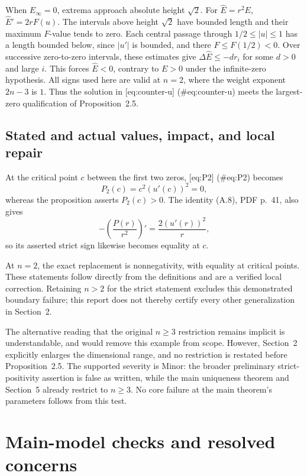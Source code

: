 \documentclass[10pt]{article}
\begin{document}
When \(E_\infty=0\), extrema approach absolute height \(\sqrt2\). For \(\widehat E=r^2E\), \(\widehat E'=2rF(u)\). The intervals above height \(\sqrt2\) have bounded length and their maximum \(F\)-value tends to zero. Each central passage through \(1/2\le|u|\le1\) has a length bounded below, since \(|u'|\) is bounded, and there \(F\le F(1/2)<0\). Over successive zero-to-zero intervals, these estimates give \(\Delta\widehat E\le-d r_i\) for some \(d>0\) and large \(i\). This forces \(\widehat E<0\), contrary to \(E>0\) under the infinite-zero hypothesis. All signs used here are valid at \(n=2\), where the weight exponent \(2n-3\) is \(1\). Thus the solution in [eq:counter-u] (\#eq:counter-u) meets the largest-zero qualification of Proposition 2.5.\par
\subsection*{Stated and actual values, impact, and local repair}
At the critical point \(c\) between the first two zeros, [eq:P2] (\#eq:P2) becomes \[P_2(c)=c^2(u'(c))^2=0,\] whereas the proposition asserts \(P_2(c)>0\). The identity (A.8), PDF p. 41, also gives \[-\left(\frac{P(r)}{r^2}\right)'
     =\frac{2(u'(r))^2}{r},\] so its asserted strict sign likewise becomes equality at \(c\).\par
At \(n=2\), the exact replacement is nonnegativity, with equality at critical points. These statements follow directly from the definitions and are a verified local correction. Retaining \(n>2\) for the strict statement excludes this demonstrated boundary failure; this report does not thereby certify every other generalization in Section 2.\par
The alternative reading that the original \(n\ge3\) restriction remains implicit is understandable, and would remove this example from scope. However, Section 2 explicitly enlarges the dimensional range, and no restriction is restated before Proposition 2.5. The supported severity is Minor: the broader preliminary strict-positivity assertion is false as written, while the main uniqueness theorem and Section 5 already restrict to \(n\ge3\). No core failure at the main theorem’s parameters follows from this test.\par
\section*{Main-model checks and resolved concerns}
\end{document}
